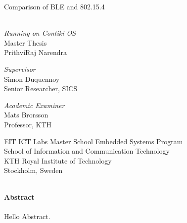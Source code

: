 \documentclass[a4paper,11pt]{report}
\begin{document}
\begin{titlepage}
\thispagestyle{empty}
\begin{center}

  \vspace{.5cm}
  \Huge{Comparison of BLE and 802.15.4}\tiny{}\\
  \vspace{0.3cm}
  \\
  \vspace{0.2cm}
  \LARGE{\textit{Running on Contiki OS}}\\
  \vspace{2cm}
  \Large{Master Thesis}\\
  

  \vspace{2cm}		
  \LARGE{PrithviRaj Narendra}
  \vspace{3.5cm} 
  
  \large{\textit{Supervisor}}\\
  \LARGE{Simon Duquennoy}\\
  \vspace{0.2cm}
  \Large{Senior Researcher, SICS}\\
  \vspace{2cm}
  
  \large{\textit{Academic Examiner}}\\
  \LARGE{Mats Brorsson}\\
  \vspace{0.2cm}
  \Large{Professor, KTH}\\
  \vspace{2cm}

\large
EIT ICT Labs Master School Embedded Systems Program\\
School of Information and Communication Technology\\
KTH Royal Institute of Technology\\
Stockholm, Sweden\\
\vspace{1cm}
\\
\end{center} 

\end{titlepage}

\newpage\null\thispagestyle{empty}\newpage

\thispagestyle{plain}
{}
\huge{\textbf{Abstract}} \\
\normalsize \\
Hello Abstract. 
\clearpage
\end{document}

